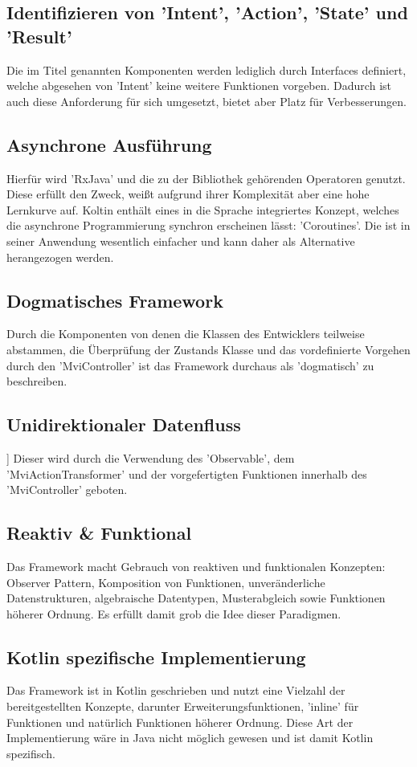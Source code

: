 \subsection{Identifizieren von 'Intent', 'Action', 'State' und 'Result'}
Die im Titel genannten Komponenten werden lediglich durch Interfaces definiert, welche abgesehen von 'Intent' keine weitere Funktionen vorgeben. Dadurch ist auch diese Anforderung für sich umgesetzt, bietet aber Platz für Verbesserungen.

\subsection{Asynchrone Ausführung}
Hierfür wird 'RxJava' und die zu der Bibliothek gehörenden Operatoren genutzt. Diese erfüllt den Zweck, weißt aufgrund ihrer Komplexität aber eine hohe Lernkurve auf. Koltin enthält eines in die Sprache integriertes Konzept, welches die asynchrone Programmierung synchron erscheinen lässt: 'Coroutines'.
\cite{kotlinCoroutines}
Die ist in seiner Anwendung wesentlich einfacher und kann daher als Alternative herangezogen werden.

\subsection{Dogmatisches Framework}
Durch die Komponenten von denen die Klassen des Entwicklers teilweise abstammen, die Überprüfung der Zustands Klasse und das vordefinierte Vorgehen durch den 'MviController' ist das Framework durchaus als 'dogmatisch' zu beschreiben.

\subsection{Unidirektionaler Datenfluss}]
Dieser wird durch die Verwendung des 'Observable', dem 'MviActionTransformer' und der vorgefertigten Funktionen innerhalb des  'MviController' geboten.

\subsection{Reaktiv \& Funktional}
Das Framework macht Gebrauch von reaktiven und funktionalen Konzepten: Observer Pattern, Komposition von Funktionen, unveränderliche Datenstrukturen, algebraische Datentypen, Musterabgleich sowie Funktionen höherer Ordnung. Es erfüllt damit grob die Idee dieser Paradigmen.

\subsection{Kotlin spezifische Implementierung}
Das Framework ist in Kotlin geschrieben und nutzt eine Vielzahl der bereitgestellten Konzepte, darunter Erweiterungsfunktionen, 'inline' für Funktionen und natürlich Funktionen höherer Ordnung. Diese Art der Implementierung wäre in Java nicht möglich gewesen und ist damit Kotlin spezifisch.


